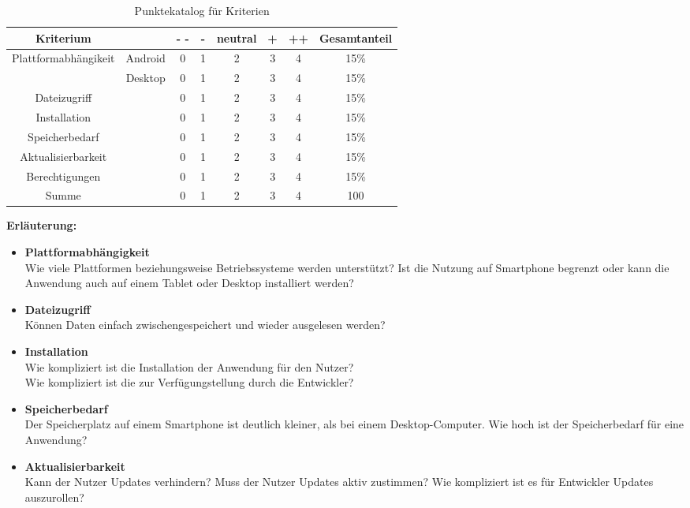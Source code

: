 \begin{table}
    \centering
    \begin{tabular}{ |c|| c|c| c| c| c| c| c|}
        \hline
        Kriterium && - - & - & neutral & + &++& Gesamtanteil \\
        \hline
    
        \multirow{2}{*}{Plattformabhängikeit} &Android& 0 & 1 & 2 & 3 & 4 & 15\%\\
        & Desktop &0 & 1 & 2 & 3 & 4 & 15\%\\
        \hline
        Dateizugriff && 0 & 1 & 2 & 3 & 4 & 15\%\\
        Installation  && 0 & 1 & 2 & 3 & 4 & 15\%\\
        Speicherbedarf && 0 & 1 & 2 & 3 & 4 & 15\%\\
        Aktualisierbarkeit  && 0 & 1 & 2 & 3 & 4 & 15\%\\
        Berechtigungen  && 0 & 1 & 2 & 3 & 4 & 15\%\\
        \hline
        \hline
        Summe && 0 & 1 & 2 & 3 & 4 & 100\\
        \hline
    \end{tabular}
    \caption{Punktekatalog für Kriterien} \label{tab:punktekatalog}
\end{table}

\textbf{Erläuterung:}
\begin{itemize}
    \item \textbf{Plattformabhängigkeit} \\
    Wie viele Plattformen beziehungsweise Betriebssysteme werden unterstützt?
    Ist die Nutzung auf Smartphone begrenzt oder kann die Anwendung auch auf einem Tablet oder Desktop installiert werden?
    \item \textbf{Dateizugriff}\\
    Können Daten einfach zwischengespeichert und wieder ausgelesen werden? 
    \item \textbf{Installation}\\
    Wie kompliziert ist die Installation der Anwendung für den Nutzer?\\
    Wie kompliziert ist die zur Verfügungstellung durch die Entwickler?
        \item \textbf{Speicherbedarf}\\
Der Speicherplatz auf einem Smartphone ist deutlich kleiner, als bei einem Desktop-Computer. Wie hoch ist der Speicherbedarf für eine Anwendung?
\item \textbf{Aktualisierbarkeit}\\
Kann der Nutzer Updates verhindern? Muss der Nutzer Updates aktiv zustimmen? Wie kompliziert ist es für Entwickler Updates auszurollen?
\end{itemize}

